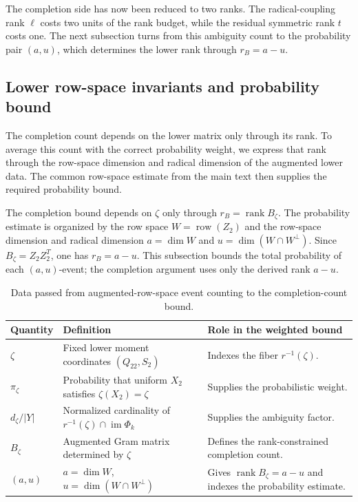\documentclass[11pt]{article}
\newcommand{\rank}{\operatorname{rank}}
\newcommand{\1}{\mathbf 1}
\theoremstyle{plain}
\theoremstyle{definition}
\theoremstyle{remark}
\begin{document}
The completion side has now been reduced to two ranks.  The radical-coupling
rank $\ell$ costs two units of the rank budget, while the residual symmetric
rank $t$ costs one.  The next subsection turns from this ambiguity count to the
probability pair $(a,u)$, which determines the lower rank through $r_B=a-u$.

\subsection{Lower row-space invariants and probability bound}
The completion count depends on the lower matrix only through its rank.  To average this count with the correct probability weight, we express that rank through the row-space dimension and radical dimension of the augmented lower data.  The common row-space estimate from the main text then supplies the required probability bound.
\label{sec:lower-block-classes}


The completion bound depends on $\zeta$ only through
$r_B=\rank B_{\zeta}$.  The probability estimate is organized by the row
space $W=\operatorname{row}(Z_2)$ and the row-space dimension and radical dimension
$a=\dim W$ and $u=\dim(W\cap W^\perp)$.  Since
$B_{\zeta}=Z_2Z_2^T$, one has $r_B=a-u$.  This subsection bounds the total
probability of each $(a,u)$-event; the completion argument uses only the
derived rank $a-u$.

\begin{table}[t]
\centering
\caption{Data passed from augmented-row-space event counting to the completion-count bound.}
\label{tab:unreported-visible-relation}
\small
\begin{tabularx}{\textwidth}{@{}l Y Y@{}}
\toprule
Quantity & Definition & Role in the weighted bound\\
\midrule
$\zeta$ & Fixed lower moment coordinates $(Q_{22},S_2)$ & Indexes the fiber $r^{-1}(\zeta)$.\\
$\pi_{\zeta}$ & Probability that uniform $X_2$ satisfies $\zeta(X_2)=\zeta$ & Supplies the probabilistic weight.\\
$d_{\zeta}/\lvert Y\rvert$ & Normalized cardinality of $r^{-1}(\zeta)\cap\operatorname{im}\Phi_k$ & Supplies the ambiguity factor.\\
$B_{\zeta}$ & Augmented Gram matrix determined by $\zeta$ & Defines the rank-constrained completion count.\\
$(a,u)$ & $a=\dim W$, $u=\dim(W\cap W^\perp)$ & Gives $\rank B_{\zeta}=a-u$ and indexes the probability estimate.\\
\bottomrule
\end{tabularx}
\end{table}
\end{document}
